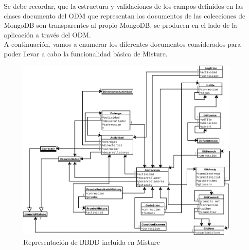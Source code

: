 Se debe recordar, que la estructura y validaciones de los campos definidos en las clases documento del ODM que representan los documentos de las colecciones de MongoDB son transparentes al propio MongoDB, se producen en el lado de la aplicación a través del ODM.\\

A continuación, vamos a enumerar los diferentes documentos considerados para poder llevar a cabo la funcionalidad básica de Misture.\\


\newpage	%

\begin{figure}[H]
   \centering
   \includegraphics[width=16cm]{img/Diagram4_bbdd}
   \caption{Representación de BBDD incluida en Misture}
   \label{figura:bbdd}
\end{figure}

\vspace{3cm}



